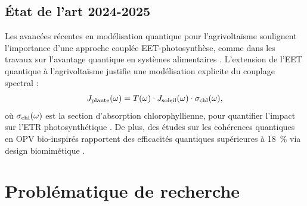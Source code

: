 \documentclass[12pt, a4paper]{article}
\begin{document}
\subsection{État de l'art 2024-2025}

Les avancées récentes en modélisation quantique pour l'agrivoltaïsme soulignent l'importance d'une approche couplée EET-photosynthèse, comme dans les travaux sur l'avantage quantique en systèmes alimentaires \cite{Kuhl2025}. L'extension de l'EET quantique à l'agrivoltaïsme justifie une modélisation explicite du couplage spectral : 
\begin{equation}
J_{\rm plante}(\omega) = T(\omega) \cdot J_{\rm soleil}(\omega) \cdot \sigma_{\rm chl}(\omega),
\label{eq:j_plante}
\end{equation}
où $\sigma_{\rm chl}(\omega)$ est la section d'absorption chlorophyllienne, pour quantifier l'impact sur l'ETR photosynthétique \cite{MaLu2025}. De plus, des études sur les cohérences quantiques en OPV bio-inspirés rapportent des efficacités quantiques supérieures à \SI{18}{\percent} via design biomimétique \cite{Zhang2021a}.

\section{Problématique de recherche}
\end{document}
